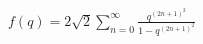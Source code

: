 \documentclass[preview]{standalone}
\begin{document}
\begin{align*}
f(q) = 2\sqrt{2} \sum_{n=0}^{\infty} \frac{q^{(2n+1)^2}}{1-q^{(2n+1)^2}}
\end{align*}
\end{document}
